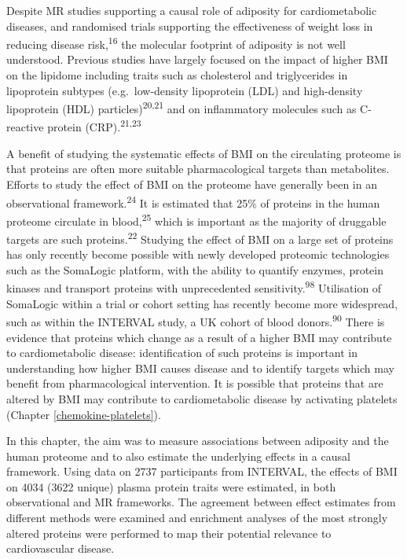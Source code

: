\documentclass[11pt,twoside]{bristolthesis}
\begin{document}
Despite MR studies supporting a causal role of adiposity for cardiometabolic diseases, and randomised trials supporting the effectiveness of weight loss in reducing disease risk,\textsuperscript{16} the molecular footprint of adiposity is not well understood. Previous studies have largely focused on the impact of higher BMI on the lipidome including traits such as cholesterol and triglycerides in lipoprotein subtypes (e.g.~low-density lipoprotein (LDL) and high-density lipoprotein (HDL) particles)\textsuperscript{20,21} and on inflammatory molecules such as C-reactive protein (CRP).\textsuperscript{21,23}

A benefit of studying the systematic effects of BMI on the circulating proteome is that proteins are often more suitable pharmacological targets than metabolites. Efforts to study the effect of BMI on the proteome have generally been in an observational framework.\textsuperscript{24} It is estimated that 25\% of proteins in the human proteome circulate in blood,\textsuperscript{25} which is important as the majority of druggable targets are such proteins.\textsuperscript{22} Studying the effect of BMI on a large set of proteins has only recently become possible with newly developed proteomic technologies such as the SomaLogic platform, with the ability to quantify enzymes, protein kinases and transport proteins with unprecedented sensitivity.\textsuperscript{98} Utilisation of SomaLogic within a trial or cohort setting has recently become more widespread, such as within the INTERVAL study, a UK cohort of blood donors.\textsuperscript{90} There is evidence that proteins which change as a result of a higher BMI may contribute to cardiometabolic disease: identification of such proteins is important in understanding how higher BMI causes disease and to identify targets which may benefit from pharmacological intervention. It is possible that proteins that are altered by BMI may contribute to cardiometabolic disease by activating platelets (Chapter \ref{chemokine-platelets}).

In this chapter, the aim was to measure associations between adiposity and the human proteome and to also estimate the underlying effects in a causal framework. Using data on 2737 participants from INTERVAL, the effects of BMI on 4034 (3622 unique) plasma protein traits were estimated, in both observational and MR frameworks. The agreement between effect estimates from different methods were examined and enrichment analyses of the most strongly altered proteins were performed to map their potential relevance to cardiovascular disease.
\end{document}
